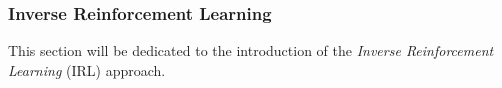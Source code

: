 \subsubsection{Inverse Reinforcement Learning}
\label{sec:irl}
This section will be dedicated to the introduction of the \textit{Inverse Reinforcement Learning} (IRL) approach. 
